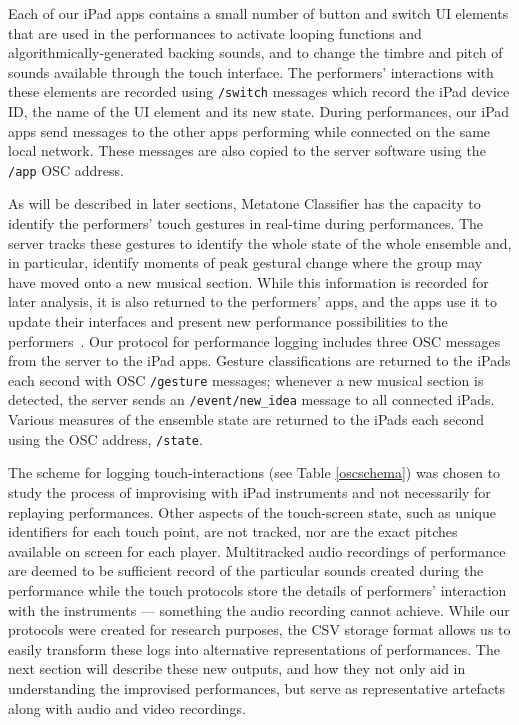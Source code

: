 \documentclass[graybox]{svmult}
\begin{document}
Each of our iPad apps contains a small number of button and switch UI
elements that are used in the performances to activate looping
functions and algorithmically-generated backing sounds, and to change the
timbre and pitch of sounds available through the touch interface. The
performers' interactions with these elements are recorded using
\texttt{/switch} messages which record the iPad device ID, the name of
the UI element and its new state. During performances, our iPad apps
send messages to the other apps performing while connected on the same
local network. These messages are also copied to the server software
using the \texttt{/app} OSC address.

As will be described in later sections, Metatone Classifier has the
capacity to identify the performers' touch gestures in real-time
during performances. The server tracks these gestures to identify the
whole state of the whole ensemble and, in particular, identify moments
of peak gestural change where the group may have moved onto a new
musical section. While this information is recorded for later
analysis, it is also returned to the performers' apps, and the apps use it to
update their interfaces and present new performance possibilities to
the performers~\cite{Martin:2015jk}. Our protocol for performance
logging includes three OSC messages from the server to the iPad apps.
Gesture classifications are returned to the iPads each second with OSC
\texttt{/gesture} messages; whenever a new musical section is
detected, the server sends an \texttt{/event/new\_idea} message to all
connected iPads. Various measures of the ensemble state are
returned to the iPads each second using the OSC address,
\texttt{/state}.

The scheme for logging touch-interactions (see Table \ref{oscschema})
was chosen to study the process of improvising with iPad instruments
and not necessarily for replaying performances. Other aspects of the
touch-screen state, such as unique identifiers for each touch point, are
not tracked, nor are the exact pitches available on screen for each
player. Multitracked audio recordings of performance are deemed to be
sufficient record of the particular sounds created during the
performance while the touch protocols store the details of performers'
interaction with the instruments --- something the audio recording cannot achieve.
While our protocols were created for research purposes, the CSV
storage format allows us to easily transform these logs into
alternative representations of performances. The next section will
describe these new outputs, and how they not only aid in understanding
the improvised performances, but serve as representative artefacts
along with audio and video recordings.
\end{document}
